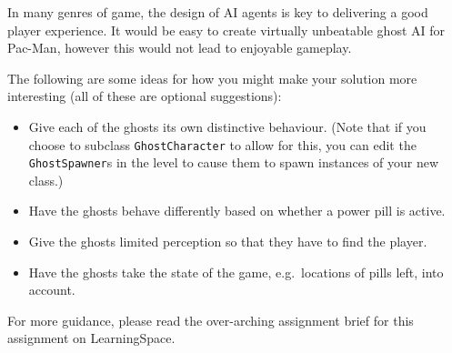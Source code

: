 \documentclass{../../fal_assignment}
\begin{document}
In many genres of game, the design of AI agents is key to delivering a good player experience.
It would be easy to create virtually unbeatable ghost AI for Pac-Man,
however this would not lead to enjoyable gameplay.

The following are some ideas for how you might make your solution more interesting (all of these are optional suggestions):

\begin{itemize}
	\item Give each of the ghosts its own distinctive behaviour. (Note that if you choose to subclass \texttt{GhostCharacter} to allow for this,
	you can edit the \texttt{GhostSpawner}s in the level to cause them to spawn instances of your new class.)
	\item Have the ghosts behave differently based on whether a power pill is active.
	\item Give the ghosts limited perception so that they have to find the player.
	\item Have the ghosts take the state of the game, e.g.\ locations of pills left, into account.
\end{itemize}

For more guidance, please read the over-arching assignment brief for this assignment on LearningSpace.
\end{document}
